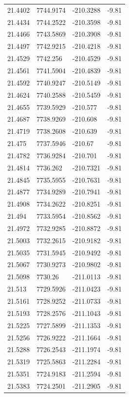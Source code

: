 \begin{table}[H]
\begin{tabular}{llll}
21.4402 & 7744.9174 & -210.3288 & -9.81 \\
21.4434 & 7744.2522 & -210.3598 & -9.81 \\
21.4466 & 7743.5869 & -210.3908 & -9.81 \\
21.4497 & 7742.9215 & -210.4218 & -9.81 \\
21.4529 & 7742.256 & -210.4529 & -9.81 \\
21.4561 & 7741.5904 & -210.4839 & -9.81 \\
21.4592 & 7740.9247 & -210.5149 & -9.81 \\
21.4624 & 7740.2588 & -210.5459 & -9.81 \\
21.4655 & 7739.5929 & -210.577 & -9.81 \\
21.4687 & 7738.9269 & -210.608 & -9.81 \\
21.4719 & 7738.2608 & -210.639 & -9.81 \\
21.475 & 7737.5946 & -210.67 & -9.81 \\
21.4782 & 7736.9284 & -210.701 & -9.81 \\
21.4814 & 7736.262 & -210.7321 & -9.81 \\
21.4845 & 7735.5955 & -210.7631 & -9.81 \\
21.4877 & 7734.9289 & -210.7941 & -9.81 \\
21.4908 & 7734.2622 & -210.8251 & -9.81 \\
21.494 & 7733.5954 & -210.8562 & -9.81 \\
21.4972 & 7732.9285 & -210.8872 & -9.81 \\
21.5003 & 7732.2615 & -210.9182 & -9.81 \\
21.5035 & 7731.5945 & -210.9492 & -9.81 \\
21.5067 & 7730.9273 & -210.9802 & -9.81 \\
21.5098 & 7730.26 & -211.0113 & -9.81 \\
21.513 & 7729.5926 & -211.0423 & -9.81 \\
21.5161 & 7728.9252 & -211.0733 & -9.81 \\
21.5193 & 7728.2576 & -211.1043 & -9.81 \\
21.5225 & 7727.5899 & -211.1353 & -9.81 \\
21.5256 & 7726.9222 & -211.1664 & -9.81 \\
21.5288 & 7726.2543 & -211.1974 & -9.81 \\
21.5319 & 7725.5863 & -211.2284 & -9.81 \\
21.5351 & 7724.9183 & -211.2594 & -9.81 \\
21.5383 & 7724.2501 & -211.2905 & -9.81 \\

\end{tabular}
\end{table}
